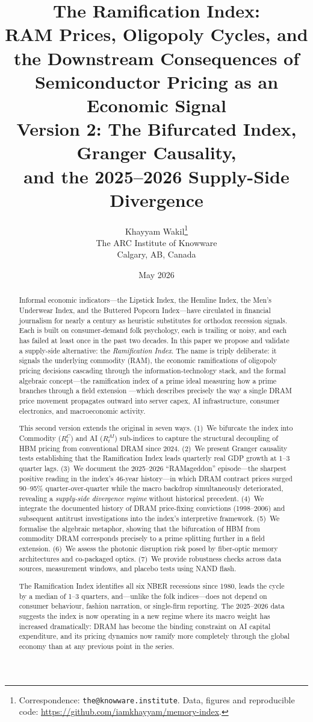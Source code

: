 \documentclass[12pt]{article}
\title{\textbf{The Ramification Index:} \\ 
\Large RAM Prices, Oligopoly Cycles, and the Downstream Consequences of Semiconductor Pricing as an Economic Signal \\[6pt]
\large Version 2: The Bifurcated Index, Granger Causality, \\ and the 2025--2026 Supply-Side Divergence}
\author{Khayyam Wakil\thanks{Correspondence: \texttt{the@knowware.institute}. Data, figures and reproducible code: \url{https://github.com/iamkhayyam/memory-index}.} \\
\small The ARC Institute of Knowware \\
\small Calgary, AB, Canada}
\date{May 2026}
\theoremstyle{definition}
\begin{document}
\maketitle

\begin{abstract}
Informal economic indicators---the Lipstick Index, the Hemline Index, the Men's Underwear Index, and the Buttered Popcorn Index---have circulated in financial journalism for nearly a century as heuristic substitutes for orthodox recession signals. Each is built on consumer-demand folk psychology, each is trailing or noisy, and each has failed at least once in the past two decades. In this paper we propose and validate a supply-side alternative: the \emph{Ramification Index}. The name is triply deliberate: it signals the underlying commodity (RAM), the economic ramifications of oligopoly pricing decisions cascading through the information-technology stack, and the formal algebraic concept---the ramification index of a prime ideal measuring how a prime branches through a field extension \cite{Neukirch1999}---which describes precisely the way a single DRAM price movement propagates outward into server capex, AI infrastructure, consumer electronics, and macroeconomic activity.

This second version extends the original in seven ways. (1)~We bifurcate the index into Commodity ($R_t^C$) and AI ($R_t^{AI}$) sub-indices to capture the structural decoupling of HBM pricing from conventional DRAM since 2024. (2)~We present Granger causality tests establishing that the Ramification Index leads quarterly real GDP growth at 1--3 quarter lags. (3)~We document the 2025--2026 ``RAMageddon'' episode---the sharpest positive reading in the index's 46-year history---in which DRAM contract prices surged 90--95\% quarter-over-quarter while the macro backdrop simultaneously deteriorated, revealing a \emph{supply-side divergence regime} without historical precedent. (4)~We integrate the documented history of DRAM price-fixing convictions (1998--2006) and subsequent antitrust investigations into the index's interpretive framework. (5)~We formalise the algebraic metaphor, showing that the bifurcation of HBM from commodity DRAM corresponds precisely to a prime splitting further in a field extension. (6)~We assess the photonic disruption risk posed by fiber-optic memory architectures and co-packaged optics. (7)~We provide robustness checks across data sources, measurement windows, and placebo tests using NAND flash.

The Ramification Index identifies all six NBER recessions since 1980, leads the cycle by a median of 1--3 quarters, and---unlike the folk indices---does not depend on consumer behaviour, fashion narration, or single-firm reporting. The 2025--2026 data suggests the index is now operating in a new regime where its macro weight has increased dramatically: DRAM has become the binding constraint on AI capital expenditure, and its pricing dynamics now ramify more completely through the global economy than at any previous point in the series.
\end{abstract}
\end{document}
